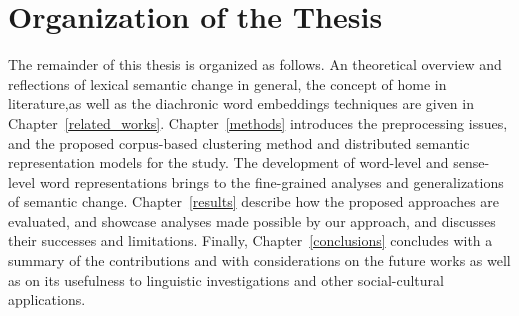 \section{Organization of the Thesis}
The remainder of this thesis is organized as follows. An theoretical overview and reflections of lexical semantic change in general, the concept of home in literature,as well as the diachronic word embeddings techniques are given in Chapter~\ref{related_works}. Chapter~\ref{methods} introduces the preprocessing issues, and the proposed corpus-based clustering method and distributed semantic representation models for the study. The development of word-level and sense-level word representations brings to the fine-grained analyses and generalizations of semantic change. Chapter~\ref{results} describe how the proposed approaches are evaluated, and showcase analyses made possible by our approach, and discusses their successes and limitations. Finally, Chapter~\ref{conclusions} concludes with a summary of the contributions and with considerations on the future works as well as on its usefulness to linguistic investigations and other social-cultural  applications.

